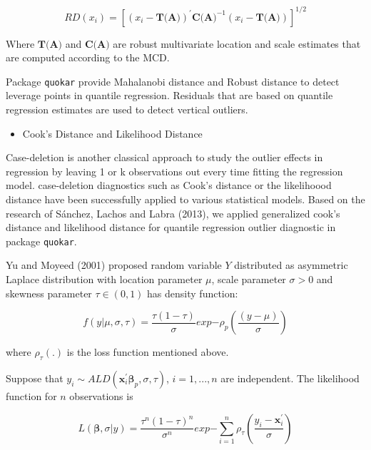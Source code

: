 \documentclass[11pt,a4paper,]{article}
\providecommand{\tightlist}{%
  \setlength{\itemsep}{0pt}\setlength{\parskip}{0pt}}
\theoremstyle{definition}
\theoremstyle{definition}
\theoremstyle{remark}
\begin{document}
\begin{equation}
RD(x_i)=[(x_i-\textbf{T(A)})^{'}\textbf{C(A)}^{-1}(x_i-\textbf{T(A)})]^{1/2}
\label{eq:rd}
\end{equation}

Where \(\textbf{T(A)}\) and \(\textbf{C(A)}\) are robust multivariate
location and scale estimates that are computed according to the MCD.

Package \texttt{quokar} provide Mahalanobi distance and Robust distance
to detect leverage points in quantile regression. Residuals that are
based on quantile regression estimates are used to detect vertical
outliers.

\begin{itemize}
\tightlist
\item
  Cook's Distance and Likelihood Distance
\end{itemize}

Case-deletion is another classical approach to study the outlier effects
in regression by leaving 1 or k observations out every time fitting the
regression model. case-deletion diagnostics such as Cook's distance or
the likelihoood distance have been successfully applied to various
statistical models. Based on the research of Sánchez, Lachos and Labra
(2013), we applied generalized cook's distance and likelihood distance
for quantile regression outlier diagnostic in package \texttt{quokar}.

Yu and Moyeed (2001) proposed random variable \(Y\) distributed as
asymmetric Laplace distribution with location parameter \(\mu\), scale
parameter \(\sigma >0\) and skewness parameter \(\tau \in (0,1)\) has
density function:

\begin{equation}
f(y|\mu, \sigma, \tau) = \frac{\tau (1-\tau)}{\sigma}exp{-\rho_{p}(\frac{(y-\mu)}{\sigma})}
\label{eq: ald}
\end{equation}

where \(\rho_{\tau}(.)\) is the loss function mentioned above.

Suppose that
\(y_i \sim ALD(\textbf{x}^{'}_{i}\mathbf{\beta}_{p}, \sigma, \tau)\),
\(i=1,...,n\) are independent. The likelihood function for \(n\)
observations is

\begin{equation}
L(\mathbf{\beta},\sigma|y)=\frac{\tau^{n}(1-\tau)^{n}}{\sigma^{n}}exp{-\sum_{i=1}^{n} \rho_{\tau}(\frac{y_i-\textbf{x}^{'}_{i}}{\sigma})}
\label{eq: ald_likelihood}
\end{equation}
\end{document}
